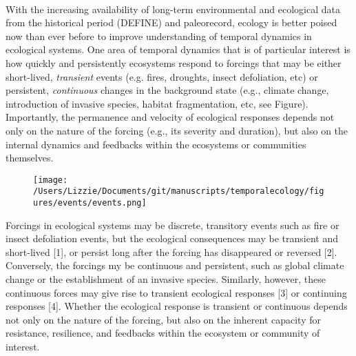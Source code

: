 \documentclass[11pt,a4paper,oneside]{article}
\begin{document}
\newpage
{}\\
\noindent With the increasing availability of long-term environmental and ecological data from the historical period (DEFINE) and paleorecord, ecology is better poised now than ever before to improve understanding of temporal dynamics in ecological systems. One area of temporal dynamics that is of particular interest is how quickly and persistently ecosystems respond to forcings that may be either short-lived, \emph{transient} events (e.g. fires, droughts, insect defoliation, etc) or persistent, \emph{continuous} changes in the background state (e.g., climate change, introduction of invasive species, habitat fragmentation, etc, see Figure). Importantly, the permanence and velocity of ecological responses depends not only on the nature of the forcing (e.g., its severity and duration), but also on the internal dynamics and feedbacks within the ecosystems or communities themselves.\\

\begin{figure}[h!]
\centering
\noindent \texttt{[image: /Users/Lizzie/Documents/git/manuscripts/temporalecology/figures/events/events.png]}
\end{figure}

Forcings in ecological systems may be discrete, transitory events such as fire or insect defoliation events, but the ecological consequences may be transient and short-lived [1], or persist long after the forcing has disappeared or reversed [2]. Conversely, the forcings my be continuous and persistent, such as global climate change or the establishment of an invasive species. Similarly, however, these continuous forces may give rise to transient ecological responses [3] or continuing responses [4]. Whether the ecological response is transient or continuous depends not only on the nature of the forcing, but also on the inherent capacity for resistance, resilience, and feedbacks within the ecosystem or community of interest.\\
\end{document}
